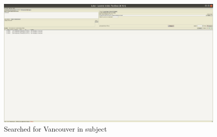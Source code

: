 \documentclass{article}
\begin{document}
\begin{figure}[h]
    \centering
    \includegraphics[width=\textwidth]{subject}
    \caption{Searched for Vancouver in subject}
    \label{fig:subject}
\end{figure}
\end{document}
